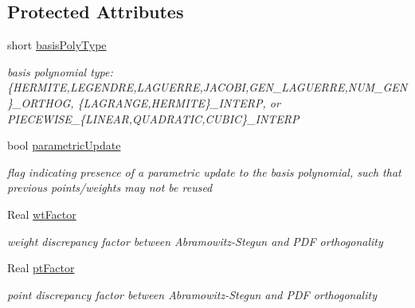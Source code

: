 \subsection*{Protected Attributes}
\begin{DoxyCompactItemize}
\item 
short \hyperlink{classPecos_1_1BasisPolynomial_a53acc6b4e7a4c8b16acc679e875bed35}{basis\+Poly\+Type}\label{classPecos_1_1BasisPolynomial_a53acc6b4e7a4c8b16acc679e875bed35}

\begin{DoxyCompactList}\small\item\em basis polynomial type\+: \{H\+E\+R\+M\+I\+TE,L\+E\+G\+E\+N\+D\+RE,L\+A\+G\+U\+E\+R\+RE,J\+A\+C\+O\+BI,G\+E\+N\+\_\+\+L\+A\+G\+U\+E\+R\+RE,N\+U\+M\+\_\+\+G\+EN\}\+\_\+\+O\+R\+T\+H\+OG, \{L\+A\+G\+R\+A\+N\+GE,H\+E\+R\+M\+I\+TE\}\+\_\+\+I\+N\+T\+E\+RP, or P\+I\+E\+C\+E\+W\+I\+S\+E\+\_\+\{L\+I\+N\+E\+AR,Q\+U\+A\+D\+R\+A\+T\+IC,C\+U\+B\+IC\}\+\_\+\+I\+N\+T\+E\+RP \end{DoxyCompactList}\item 
bool \hyperlink{classPecos_1_1BasisPolynomial_aa46c2df8f8cb2bdb4d2193fca54d19a5}{parametric\+Update}\label{classPecos_1_1BasisPolynomial_aa46c2df8f8cb2bdb4d2193fca54d19a5}

\begin{DoxyCompactList}\small\item\em flag indicating presence of a parametric update to the basis polynomial, such that previous points/weights may not be reused \end{DoxyCompactList}\item 
Real \hyperlink{classPecos_1_1BasisPolynomial_a51c13e36e22c4aa68e0c555eea44ed34}{wt\+Factor}\label{classPecos_1_1BasisPolynomial_a51c13e36e22c4aa68e0c555eea44ed34}

\begin{DoxyCompactList}\small\item\em weight discrepancy factor between Abramowitz-\/\+Stegun and P\+DF orthogonality \end{DoxyCompactList}\item 
Real \hyperlink{classPecos_1_1BasisPolynomial_a8ea6ec2f6b4e706218ad44e5914c8632}{pt\+Factor}\label{classPecos_1_1BasisPolynomial_a8ea6ec2f6b4e706218ad44e5914c8632}

\begin{DoxyCompactList}\small\item\em point discrepancy factor between Abramowitz-\/\+Stegun and P\+DF orthogonality \end{DoxyCompactList}\end{DoxyCompactItemize}
